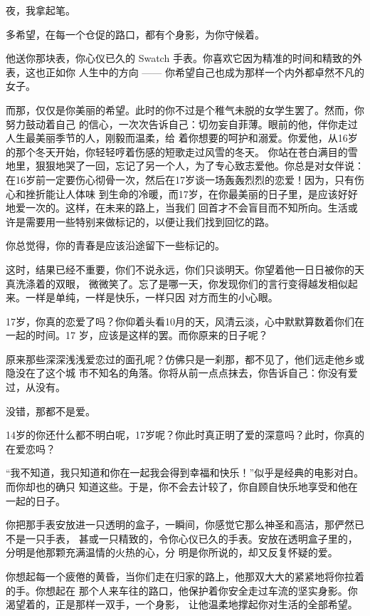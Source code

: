 	\endwriting



		夜，我拿起笔。

		多希望，在每一个仓促的路口，都有个身影，为你守候着。

		\vspace{1em}
		他送你那块表，你心仪已久的 Swatch 手表。你喜欢它因为精准的时间和精致的外表，这也正如你
	人生中的方向 —— 你希望自己也成为那样一个内外都卓然不凡的女子。

		而那，仅仅是你美丽的希望。此时的你不过是个稚气未脱的女学生罢了。然而，你努力鼓动着自己
	的信心，一次次告诉自己：切勿妄自菲薄。眼前的他，伴你走过人生最美丽季节的人，刚毅而温柔，给
	着你想要的呵护和溺爱。你爱他，从16岁的那个冬天开始，你轻轻哼着伤感的短歌走过风雪的冬天。
	你站在苍白满目的雪地里，狠狠地哭了一回，忘记了另一个人，为了专心致志爱他。你总是对女伴说：
	在16岁前一定要伤心彻骨一次，然后在17岁谈一场轰轰烈烈的恋爱！因为，只有伤心和挫折能让人体味
	到生命的冷暖，而17岁，在你最美丽的日子里，是应该好好地爱一次的。这样，在未来的路上，当我们
	回首才不会盲目而不知所向。生活或许是需要用一些特别来做标记的，以便让我们找到回忆的路。

		你总觉得，你的青春是应该沿途留下一些标记的。

		这时，结果已经不重要，你们不说永远，你们只谈明天。你望着他一日日被你的天真洗涤着的双眼，
	微微笑了。忘了是哪一天，你发现你们的言行变得越发相似起来。一样是单纯，一样是快乐，一样只因
	对方而生的小心眼。

		17岁，你真的恋爱了吗？你仰着头看10月的天，风清云淡，心中默默算数着你们在一起的时间。17
	岁，应该是这样的罢。而你原来的日子呢？

		原来那些深深浅浅爱恋过的面孔呢？仿佛只是一刹那，都不见了，他们远走他乡或隐没在了这个城
	市不知名的角落。你将从前一点点抹去，你告诉自己：你没有爱过，从没有。

		没错，那都不是爱。

		14岁的你还什么都不明白呢，17岁呢？你此时真正明了爱的深意吗？此时，你真的在爱恋吗？

		“我不知道，我只知道和你在一起我会得到幸福和快乐！”似乎是经典的电影对白。而你却也的确只
	知道这些。于是，你不会去计较了，你自顾自快乐地享受和他在一起的日子。

		你把那手表安放进一只透明的盒子，一瞬间，你感觉它那么神圣和高洁，那俨然已不是一只手表，
	甚或一只精致的，令你心仪已久的手表。安放在透明盒子里的，分明是他那颗充满温情的火热的心，分
	明是你所说的，却又反复怀疑的爱。

		你想起每一个疲倦的黄昏，当你们走在归家的路上，他那双大大的紧紧地将你拉着的手。你想起在
	那个人来车往的路口，他保护着你安全走过车流的坚实身影。你渴望着的，正是那样一双手，一个身影，
	让他温柔地撑起你对生活的全部希望。


